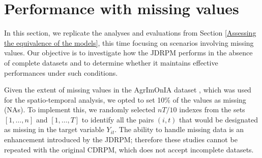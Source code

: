 \documentclass[12pt,	%
	a4paper,		%
	twoside,		%
	openright,		%
	titlepage,%
	]{book}
\theoremstyle{definition}
\let\cite\citep
\begin{document}



\section{Performance with missing values}
\label{Performance with missing values}

In this section, we replicate the analyses and evaluations from Section \ref{Assessing the equivalence of the models}, this time focusing on scenarios involving missing values. Our objective is to investigate how the JDRPM performs in the absence of complete datasets and to determine whether it maintains effective performances under such conditions.

Given the extent of missing values in the AgrImOnIA dataset \cite{agrimonia}, which was used for the spatio-temporal analysis, we opted to set 10\% of the values as missing (NAs). To implement this, we randomly selected $nT/10$ indexes from the sets $[1,\ldots,n]$ and $[1,\ldots,T]$ to identify all the pairs $(i,t)$ that would be designated as missing in the target variable $Y_{it}$. The ability to handle missing data is an enhancement introduced by the JDRPM; therefore these studies cannot be repeated with the original CDRPM, which does not accept incomplete datasets.

\end{document}
